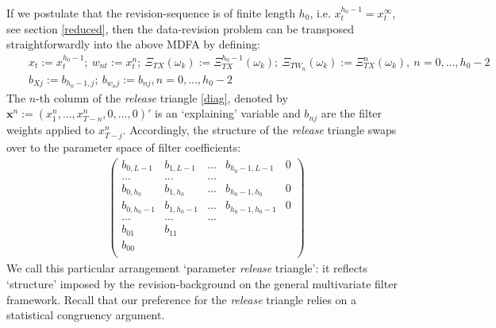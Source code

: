 \documentclass[11pt]{article}
\begin{document}
If we postulate that the revision-sequence is of finite length $h_0$, i.e. $x_t^{h_0-1}=x_t^\infty$, see section \ref{reduced}, then the data-revision problem can be transposed straightforwardly into the above MDFA by defining:
\begin{eqnarray*}
&&x_t:=x_t^{h_0-1};~w_{nt}:=x_t^n ;~ \Xi_{TX}(\omega_k):=\Xi_{TX}^{h_0-1}(\omega_k);~\Xi_{TW_n}(\omega_k):=\Xi_{TX}^n(\omega_k),~n=0,...,h_0-2\\
&&b_{Xj}:=b_{h_0-1,j};~b_{w_nj}:=b_{nj}, n=0,...,h_0-2
\end{eqnarray*}
The $n$-th column of the \emph{release} triangle \ref{diag}, denoted by $\mathbf{x}^n:=(x_1^n,...,x_{T-n}^n,0,...,0)'$ is an `explaining' variable and $b_{nj}$ are the filter weights applied to $x_{T-j}^n$. Accordingly, the structure of the \emph{release} triangle swaps over to the parameter space of filter coefficients:
\begin{eqnarray}\label{mathbf}
\left(
  \begin{array}{ccccc}
    b_{0,L-1} & b_{1,L-1}  & ... &b_{h_0-1,L-1}  & 0  \\
    ... &... &... &  &  \\
    b_{0,h_0} & b_{1,h_0}  & ... &b_{h_0-1,h_0}  & 0  \\
    b_{0,h_0-1} & b_{1,h_0-1} & ... & b_{h_0-1,h_0-1} &0  \\
    ... &... &... &  &  \\
    b_{01} & b_{11} &  &  &  \\
    b_{00} &  &  &  & \\
  \end{array}
\right)
\end{eqnarray}
We call this particular arrangement `parameter \emph{release} triangle': it reflects `structure' imposed by the revision-background on the general multivariate filter framework. Recall that our preference for the \emph{release} triangle relies on a statistical congruency argument.\\
\end{document}
